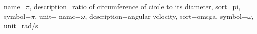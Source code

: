 
{
  name={\ensuremath{\pi}},
  description={ratio of circumference of circle to its diameter},
  sort=pi,
  symbol={\ensuremath{\pi}},
  unit={}
}
{
  name={\ensuremath{\omega}},
  description={angular velocity},
  sort=omega,
  symbol={\ensuremath{\omega}},
  unit={\si{rad/s}}
}
